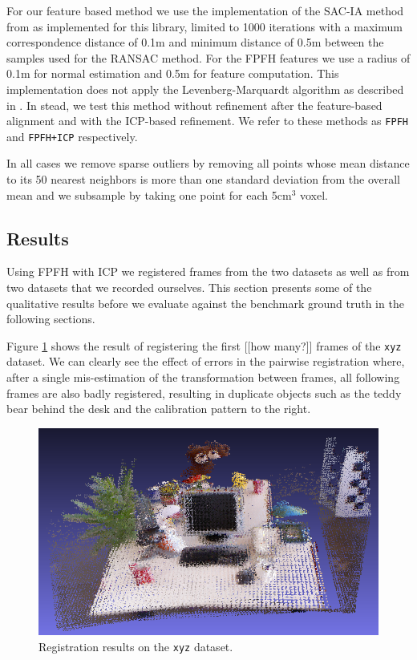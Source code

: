 \documentclass[a4paper]{article}
\begin{document}
 For our feature based method we use the implementation of the \ac{SAC-IA} method from \cite{rusu2009fast} as implemented for this library, limited to 1000 iterations with a maximum correspondence distance of 0.1m and minimum distance of 0.5m between the samples used for the \ac{RANSAC} method. For the \ac{FPFH} features we use a radius of 0.1m for normal estimation and 0.5m for feature computation. This implementation does not apply the Levenberg-Marquardt algorithm as described in \cite{rusu2009fast}. In stead, we test this method without refinement after the feature-based alignment and with the ICP-based refinement. We refer to these methods as \texttt{FPFH} and \texttt{FPFH+ICP} respectively.
 
 In all cases we remove sparse outliers by removing all points whose mean distance to its 50 nearest neighbors is more than one standard deviation from the overall mean and we subsample by taking one point for each 5cm$^3$ voxel.


\subsection{Results}

Using \ac{FPFH} with \ac{ICP} we registered frames from the two datasets as well as from two datasets that we recorded ourselves. This section presents some of the qualitative results before we evaluate against the benchmark ground truth in the following sections.

Figure \ref{fig:xyz_results} shows the result of registering the first [[how many?]] frames of the \texttt{xyz} dataset. We can clearly see the effect of errors in the pairwise registration where, after a single mis-estimation of the transformation between frames, all following frames are also badly registered, resulting in duplicate objects such as the teddy bear behind the desk and the calibration pattern to the right.

\begin{figure}[htbp]
    \centering
        \includegraphics[width=\textwidth]{ims/xyz_results.png}
    \caption{Registration results on the \texttt{xyz} dataset.}
    \label{fig:xyz_results}
\end{figure}
\end{document}

